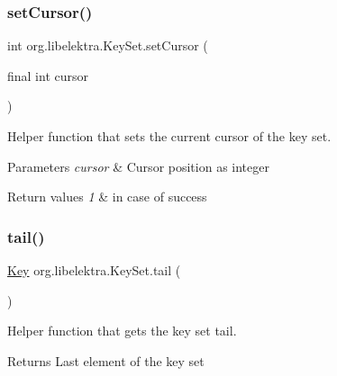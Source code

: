 \subsubsection{\texorpdfstring{set\+Cursor()}{setCursor()}}
{\footnotesize\ttfamily int org.\+libelektra.\+Key\+Set.\+set\+Cursor (\begin{DoxyParamCaption}\item[{final int}]{cursor }\end{DoxyParamCaption})\hspace{0.3cm}{\ttfamily [inline]}}



Helper function that sets the current cursor of the key set. 


\begin{DoxyParams}{Parameters}
{\em cursor} & Cursor position as integer \\
\hline
\end{DoxyParams}

\begin{DoxyRetVals}{Return values}
{\em 1} & in case of success \\
\hline
\end{DoxyRetVals}
\mbox{\label{classorg_1_1libelektra_1_1KeySet_ab81aff6c88595b3f4c3307d1f996857f}} 
\subsubsection{\texorpdfstring{tail()}{tail()}}
{\footnotesize\ttfamily \hyperlink{classorg_1_1libelektra_1_1Key}{Key} org.\+libelektra.\+Key\+Set.\+tail (\begin{DoxyParamCaption}{ }\end{DoxyParamCaption})\hspace{0.3cm}{\ttfamily [inline]}}



Helper function that gets the key set tail. 

\begin{DoxyReturn}{Returns}
Last element of the key set 
\end{DoxyReturn}
\mbox{\label{classorg_1_1libelektra_1_1KeySet_a9c1e2918acce8c7cda5be406989c87af}} 
